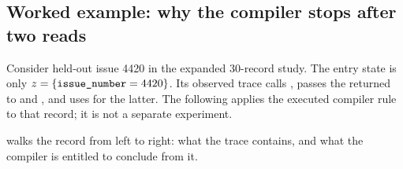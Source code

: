 \subsection{Worked example: why the compiler stops after two reads}
\label{sec:worked-example}

Consider held-out issue 4420 in the expanded 30-record study.  The entry state is only
$z=\{\texttt{issue\_number}=4420\}$.  Its observed trace calls , passes
the returned \mbox{} to  and , and
uses  for the latter.  The following applies the executed compiler rule
to that record; it is not a separate experiment.

 walks the record from left to right: what the trace contains, and
what the compiler is entitled to conclude from it.

